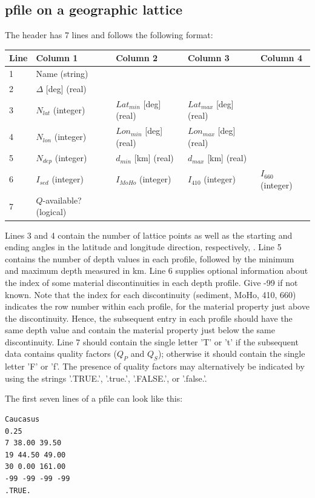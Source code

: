 \documentclass[11pt]{report}
\begin{document}
\subsection{pfile on a geographic lattice}
The header has 7 lines and follows the following format:
\begin{center}
\begin{tabular}{lllll}\hline
Line & Column 1& Column 2& Column 3& Column 4\\ \hline
1 & Name (string) & & & \\ \hline
2 & $\Delta$ [deg] (real) & & & \\ \hline
3 & $N_{lat}$ (integer) & $Lat_{min}$ [deg] (real) & $Lat_{max}$ [deg] (real) & \\ \hline
4 & $N_{lon}$ (integer) & $Lon_{min}$ [deg] (real) & $Lon_{max}$ [deg] (real) & \\ \hline
5 & $N_{dep}$ (integer) & $d_{min}$ [km] (real) & $d_{max}$ [km] (real) & \\ \hline
6 & $I_{sed}$ (integer) & $I_{MoHo}$ (integer) & $I_{410}$ (integer) & $I_{660}$ (integer) \\ \hline
7 & $Q$-available? (logical) \\ \hline
\end{tabular}
\end{center}
Lines 3 and 4 contain the number of lattice points as well as the starting and ending angles in the
latitude and longitude direction, respectively, . Line 5 contains the number of depth values in each
profile, followed by the minimum and maximum depth measured in km. Line 6 supplies optional
information about the index of some material discontinuities in each depth profile. Give -99 if not
known. Note that the index for each discontinuity (sediment, MoHo, 410, 660) indicates the row
number within each profile, for the material property just above the discontinuity. Hence, the
subsequent entry in each profile should have the same depth value and contain the material property
just below the same discontinuity. Line 7 should contain the single letter 'T' or 't' if the
subsequent data contains quality factors ($Q_P$ and $Q_S$); otherwise it should contain the single
letter 'F' or 'f'. The presence of quality factors may alternatively be indicated by using the
strings '.TRUE.', '.true.', '.FALSE.', or '.false.'. 

The first seven lines of a pfile can look like this:
\begin{verbatim}
Caucasus
0.25
7 38.00 39.50
19 44.50 49.00
30 0.00 161.00
-99 -99 -99 -99
.TRUE.
\end{verbatim}
\end{document}
